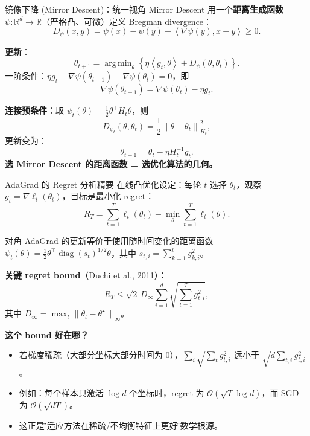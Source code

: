 \documentclass[aspectratio=169,10pt]{ctexbeamer}
\newcommand{\R}{\mathbb{R}}
\newcommand{\diag}{\operatorname{diag}}
\newcommand{\grad}{\nabla}
\newcommand{\norm}[1]{\left\lVert #1 \right\rVert}
\newcommand{\ip}[2]{\left\langle #1,#2 \right\rangle}
\DeclareMathOperator*{\argmin}{arg\,min}
\begin{document}
\begin{frame}{镜像下降 (Mirror Descent)：统一视角}
Mirror Descent 用一个\textbf{距离生成函数} $\psi:\R^d\to\R$（严格凸、可微）定义 Bregman divergence：
\[
  D_\psi(x,y)=\psi(x)-\psi(y)-\ip{\grad\psi(y)}{x-y}\ge0.
\]

\vspace{.2cm}
\textbf{更新}：
\[
  \theta_{t+1}=\argmin_{\theta}\left\{\eta\ip{g_t}{\theta}+D_\psi(\theta,\theta_t)\right\}.
\]
一阶条件：$\eta g_t+\grad\psi(\theta_{t+1})-\grad\psi(\theta_t)=0$，即
\[
  \grad\psi(\theta_{t+1})=\grad\psi(\theta_t)-\eta g_t.
\]

\vspace{.2cm}
\textbf{连接预条件}：取 $\psi_t(\theta)=\frac12\theta^\top H_t\theta$，则
\[
  D_{\psi_t}(\theta,\theta_t)=\frac12\norm{\theta-\theta_t}_{H_t}^2,
\]
更新变为：
\[
  \theta_{t+1}=\theta_t-\eta H_t^{-1}g_t.
\]
\textbf{选 Mirror Descent 的距离函数 = 选优化算法的几何。}
\end{frame}

\begin{frame}{AdaGrad 的 Regret 分析精要}
在线凸优化设定：每轮 $t$ 选择 $\theta_t$，观察 $g_t=\grad\ell_t(\theta_t)$，目标是最小化 regret：
\[
  R_T=\sum_{t=1}^T\ell_t(\theta_t)-\min_{\theta}\sum_{t=1}^T\ell_t(\theta).
\]

\vspace{.2cm}
对角 AdaGrad 的更新等价于使用随时间变化的距离函数
$\psi_t(\theta)=\frac12\theta^\top\diag(s_t)^{1/2}\theta$，其中 $s_{t,i}=\sum_{k=1}^t g_{k,i}^2$。

\vspace{.2cm}
\textbf{关键 regret bound}（Duchi et al., 2011）：
\[
  R_T\le\sqrt{2}\,D_\infty\sum_{i=1}^d\sqrt{\sum_{t=1}^T g_{t,i}^2},
\]
其中 $D_\infty=\max_{t}\norm{\theta_t-\theta^\star}_\infty$。

\vspace{.2cm}
\textbf{这个 bound 好在哪？}
\begin{itemize}
  \item 若梯度稀疏（大部分坐标大部分时间为 0），$\sum_i\sqrt{\sum_t g_{t,i}^2}$ 远小于 $\sqrt{d\sum_{t,i}g_{t,i}^2}$。
  \item 例如：每个样本只激活 $\log d$ 个坐标时，regret 为 $\mathcal{O}(\sqrt{T}\log d)$，而 SGD 为 $\mathcal{O}(\sqrt{dT})$。
  \item 这正是\"自适应方法在稀疏/不均衡特征上更好\"的数学根源。
\end{itemize}
\end{frame}
\end{document}
